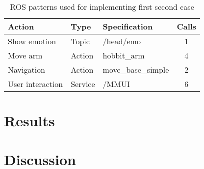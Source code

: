 \begin{table}
	\centering
	\begin{tabular}{l l l c}
		\toprule
        Action & Type & Specification & Calls \\
        \midrule
        Show emotion & Topic & /head/emo  & 1 \\
        Move arm & Action & hobbit\_arm & 4 \\
        Navigation & Action & move\_base\_simple & 2 \\
        User interaction & Service & /MMUI & 6 \\
		\bottomrule
	\end{tabular}
	\caption{ROS patterns used for implementing first second case}
	\label{tab:SecondUseCaseSpecs}
\end{table}




\section{Results}

\section{Discussion}